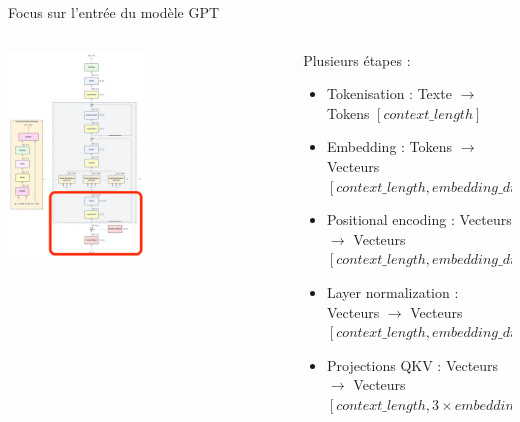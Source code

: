 \documentclass[aspectratio=169]{beamer}
\begin{document}
\begin{frame}{Focus sur l'entrée du modèle GPT}
    \begin{columns}
        \begin{column}{0.5\textwidth}
            \begin{center}
                \includegraphics[width=0.5\textwidth]{images/gpt2_in.png}
            \end{center}
        \end{column}
        \begin{column}{0.5\textwidth}
            Plusieurs étapes :
            \begin{itemize}
                \item Tokenisation : Texte $\rightarrow$ Tokens $[context\_length]$
                \item Embedding : Tokens $\rightarrow$ Vecteurs $[context\_length, embedding\_dim]$
                \item Positional encoding : Vecteurs $\rightarrow$ Vecteurs $[context\_length, embedding\_dim]$
                \item Layer normalization : Vecteurs $\rightarrow$ Vecteurs $[context\_length, embedding\_dim]$
                \item Projections QKV : Vecteurs $\rightarrow$ Vecteurs $[context\_length, 3 \times embedding\_dim]$
            \end{itemize}
        \end{column}
    \end{columns}
\end{frame}
\end{document}
